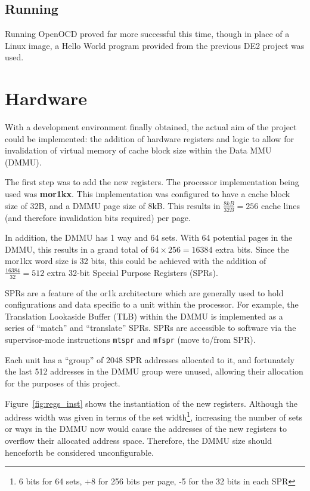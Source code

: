\subsection{Running}
Running OpenOCD proved far more successful this time, though in place of a Linux image, a Hello World program provided from the previous DE2 project was used.

\section{Hardware}
\label{sec:har}
With a development environment finally obtained, the actual aim of the project could be implemented: the addition of hardware registers and logic to allow for invalidation of virtual memory of cache block size within the Data MMU (DMMU).

The first step was to add the new registers. The processor implementation being used was \textbf{mor1kx}\cite{mor1kx}. This implementation was configured to have a cache block size of 32B, and a DMMU page size of 8kB. This results in $\frac{8kB}{32B} = 256$ cache lines (and therefore invalidation bits required) per page.

In addition, the DMMU has 1 way and 64 sets. With 64 potential pages in the DMMU, this results in a grand total of $64 \times 256 = 16384$ extra bits. Since the mor1kx word size is 32 bits, this could be achieved with the addition of $\frac{16384}{32} = 512$ extra 32-bit Special Purpose Registers (SPRs).

SPRs are a feature of the or1k architecture which are generally used to hold configurations and data specific to a unit within the processor. For example, the Translation Lookaside Buffer (TLB) within the DMMU is implemented as a series of ``match'' and ``translate'' SPRs. SPRs are accessible to software via the supervisor-mode instructions \texttt{mtspr} and \texttt{mfspr} (move to\slash from SPR).

Each unit has a ``group'' of 2048 SPR addresses allocated to it, and fortunately the last 512 addresses in the DMMU group were unused, allowing their allocation for the purposes of this project.

Figure~\ref{fig:regs_inst} shows the instantiation of the new registers. Although the address width was given in terms of the set width\footnote{6 bits for 64 sets, +8 for 256 bits per page, -5 for the 32 bits in each SPR}, increasing the number of sets or ways in the DMMU now would cause the addresses of the new registers to overflow their allocated address space. Therefore, the DMMU size should henceforth be considered unconfigurable.


